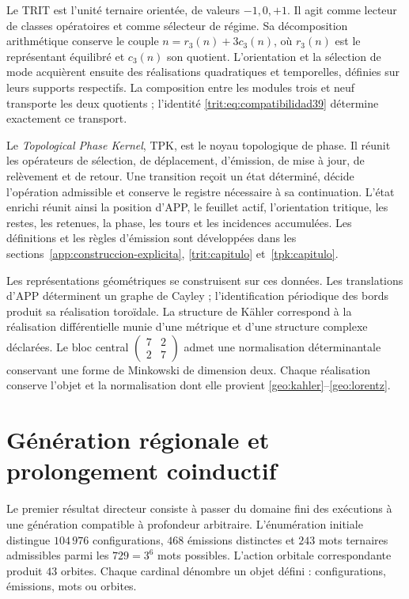 Le TRIT est l’unité ternaire orientée, de valeurs \(-1,0,+1\). Il agit comme lecteur de classes opératoires et comme sélecteur de régime. Sa décomposition arithmétique conserve le couple \(n=r_3(n)+3c_3(n)\), où \(r_3(n)\) est le représentant équilibré et \(c_3(n)\) son quotient. L’orientation et la sélection de mode acquièrent ensuite des réalisations quadratiques et temporelles, définies sur leurs supports respectifs. La composition entre les modules trois et neuf transporte les deux quotients ; l’identité \eqref{trit:eq:compatibilidad39} détermine exactement ce transport.

Le \emph{Topological Phase Kernel}, TPK, est le noyau topologique de phase. Il réunit les opérateurs de sélection, de déplacement, d’émission, de mise à jour, de relèvement et de retour. Une transition reçoit un état déterminé, décide l’opération admissible et conserve le registre nécessaire à sa continuation. L’état enrichi réunit ainsi la position d’APP, le feuillet actif, l’orientation tritique, les restes, les retenues, la phase, les tours et les incidences accumulées. Les définitions et les règles d’émission sont développées dans les sections~\ref{app:construccion-explicita}, \ref{trit:capitulo} et~\ref{tpk:capitulo}.

Les représentations géométriques se construisent sur ces données. Les translations d’APP déterminent un graphe de Cayley ; l’identification périodique des bords produit sa réalisation toroïdale. La structure de Kähler correspond à la réalisation différentielle munie d’une métrique et d’une structure complexe déclarées. Le bloc central \(\left(\begin{smallmatrix}7&2\\2&7\end{smallmatrix}\right)\) admet une normalisation déterminantale conservant une forme de Minkowski de dimension deux. Chaque réalisation conserve l’objet et la normalisation dont elle provient \ref{geo:kahler}--\ref{geo:lorentz}.

\section*{Génération régionale et prolongement coinductif}

Le premier résultat directeur consiste à passer du domaine fini des exécutions à une génération compatible à profondeur arbitraire. L’énumération initiale distingue \(104\,976\) configurations, \(468\) émissions distinctes et \(243\) mots ternaires admissibles parmi les \(729=3^6\) mots possibles. L’action orbitale correspondante produit \(43\) orbites. Chaque cardinal dénombre un objet défini : configurations, émissions, mots ou orbites.

